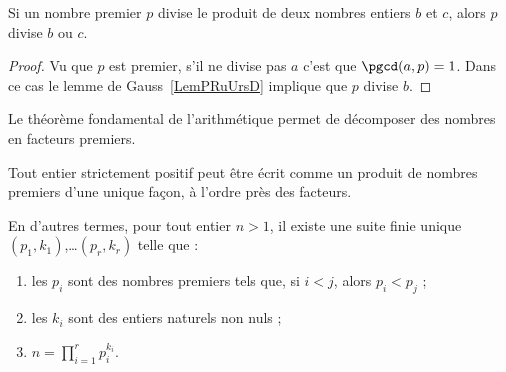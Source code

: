 \begin{lemma}       \label{LemAXINooOeuMJZ}
    Si un nombre premier $p$ divise le produit de deux nombres entiers $b$ et $c$, alors $p$ divise $b$ ou $c$.
\end{lemma}

\begin{proof}
    Vu que \( p\) est premier, s'il ne divise pas \( a\) c'est que \( \pgcd(a,p)=1\). Dans ce cas le lemme de Gauss~\ref{LemPRuUrsD} implique que \( p\) divise \( b\).
\end{proof}

Le théorème fondamental de l'arithmétique permet de décomposer des nombres en facteurs premiers.

\begin{theorem}        \label{ThoAJFJooAveRvY}
    Tout entier strictement positif peut être écrit comme un produit de nombres premiers d'une unique façon, à l'ordre près des facteurs.

    En d'autres termes, pour tout entier \( n>1\), il existe une suite finie unique $(p_1, k_1)$,\ldots $(p_r, k_r)$ telle que :
    \begin{enumerate}
        \item
    les \( p_i\) sont des nombres premiers tels que, si $i < j$, alors $p_i < p_j$ ;
    \item
    les \( k_i\) sont des entiers naturels non nuls ;
    \item
        \( n=\prod_{i=1}^rp_i^{k_i}\).
    \end{enumerate}
\end{theorem}

